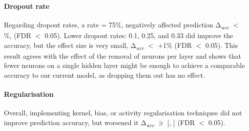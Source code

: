 \paragraph{Dropout rate}

Regarding dropout rates, a rate = 75\%, negatively affected prediction  Δ\textsubscript{\textit{acc}} $<$ \%, (FDR $<$ 0.05). Lower dropout rates: 0.1, 0.25, and 0.33 did improve the accuracy, but the effect size is very small, Δ\textsubscript{\textit{acc}} $<$ +1\% (FDR $<$ 0.05). This result agrees with the effect of the removal of neurons per layer and shows that fewer neurons on a single hidden layer might be enough to achieve a comparable accuracy to our current model, as dropping them out has no effect.

\paragraph{Regularisation}

Overall, implementing kernel, bias, or activity regularisation techniques did not improve prediction accuracy, but worsened it Δ\textsubscript{\textit{acc}} $\ni$ [, ] (FDR $<$ 0.05).

\vspace{+19pt} %


